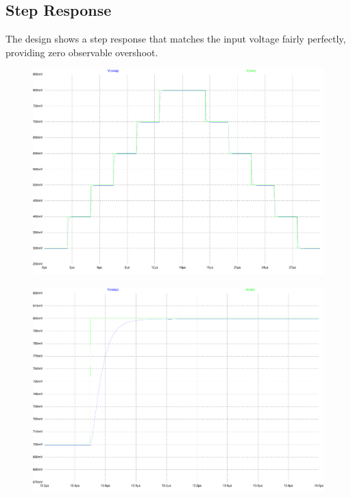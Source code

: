 \subsection{Step Response}

The design shows a step response that matches the input voltage fairly perfectly, providing zero observable overshoot.
\begin{figure}[H]
	\centering
	\includegraphics[width=\textwidth]{./images/StepResponse-both.pdf}
	\caption{}
	\label{fig:step}
\end{figure}


\begin{figure}[H]
	\centering
	\includegraphics[width=\textwidth]{./images/StepResponse-zoom.pdf}
	\caption{}
	\label{fig:ztep}
\end{figure}
